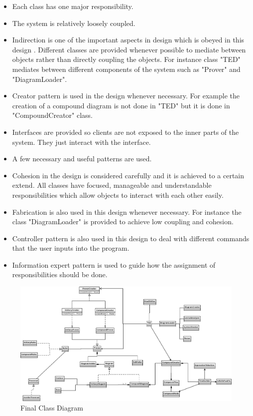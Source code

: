 \documentclass[10pt, a4paper, titlepage]{article}
\begin{document}
\begin{itemize}
\item Each class has one major responsibility.
\item The system is relatively loosely coupled.
\item Indirection is one of the important aspects in design which is obeyed in this design \cite{Larman_book}. Different classes are provided whenever possible to mediate between objects rather than directly coupling the objects. For instance class "TED" mediates between different components of the system such as "Prover" and "DiagramLoader".
\item Creator pattern is used in the design whenever necessary. For example the creation of a compound diagram is not done in "TED" but it is done in "CompoundCreator" class. 
\item Interfaces are provided so clients are not exposed to the inner parts of the system. They just interact with the interface.
\item A few necessary and useful patterns are used.
\item Cohesion in the design is considered carefully and it is achieved to a certain extend. All classes have focused, manageable and understandable responsibilities which allow objects to interact with each other easily.
\item Fabrication is also used in this design whenever necessary. For instance the class "DiagramLoader" is provided to achieve low coupling and cohesion.
\item Controller pattern is also used in this design to deal with different commands that the user inputs into the program.
\item Information expert pattern is used to guide how the assignment of responsibilities should be done.
\end{itemize}

\begin{figure}[]
\centering
\includegraphics[angle=90, scale=0.4]{images/des10.jpeg}
\caption{Final Class Diagram}
\label{des10}
\end{figure}
\end{document}
